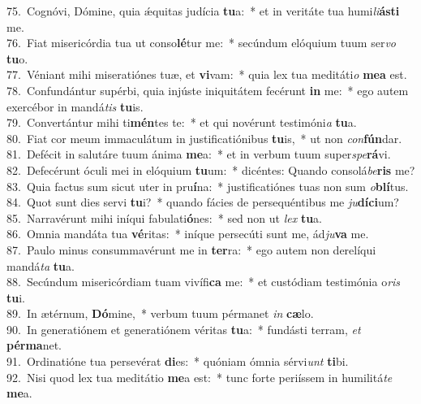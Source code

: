 {75.~}Cognóvi, Dómine, quia ǽquitas judícia \textbf{tu}a:~* et in veritáte tua humi\textit{li}\textbf{á}\textbf{sti} me.\\
{76.~}Fiat misericórdia tua ut conso\textbf{lé}tur me:~* secúndum elóquium tuum ser\textit{vo} \textbf{tu}o.\\
{77.~}Véniant mihi miseratiónes tuæ, et \textbf{vi}vam:~* quia lex tua meditáti\textit{o} \textbf{me}\textbf{a} est.\\
{78.~}Confundántur supérbi, quia injúste iniquitátem fecérunt \textbf{in} me:~* ego autem exercébor in mandá\textit{tis} \textbf{tu}is.\\
{79.~}Convertántur mihi ti\textbf{mén}tes te:~* et qui novérunt testimóni\textit{a} \textbf{tu}a.\\
{80.~}Fiat cor meum immaculátum in justificatiónibus \textbf{tu}is,~* ut non \textit{con}\textbf{fún}dar.\\
{81.~}Defécit in salutáre tuum ánima \textbf{me}a:~* et in verbum tuum super\textit{spe}\textbf{rá}vi.\\
{82.~}Defecérunt óculi mei in elóquium \textbf{tu}um:~* dicéntes: Quando consolá\textit{be}\textbf{ris} me?\\
{83.~}Quia factus sum sicut uter in pru\textbf{í}na:~* justificatiónes tuas non sum \textit{o}\textbf{blí}tus.\\
{84.~}Quot sunt dies servi \textbf{tu}i?~* quando fácies de persequéntibus me \textit{ju}\textbf{dí}\textbf{ci}um?\\
{85.~}Narravérunt mihi iníqui fabulati\textbf{ó}nes:~* sed non ut \textit{lex} \textbf{tu}a.\\
{86.~}Omnia mandáta tua \textbf{vé}ritas:~* iníque persecúti sunt me, ád\textit{ju}\textbf{va} me.\\
{87.~}Paulo minus consummavérunt me in \textbf{ter}ra:~* ego autem non derelíqui mandá\textit{ta} \textbf{tu}a.\\
{88.~}Secúndum misericórdiam tuam vivífi\textbf{ca} me:~* et custódiam testimónia o\textit{ris} \textbf{tu}i.\\
{89.~}In ætérnum, \textbf{Dó}mine,~* verbum tuum pérmanet \textit{in} \textbf{cæ}lo.\\
{90.~}In generatiónem et generatiónem véritas \textbf{tu}a:~* fundásti terram, \textit{et} \textbf{pér}\textbf{ma}net.\\
{91.~}Ordinatióne tua persevérat \textbf{di}es:~* quóniam ómnia sérvi\textit{unt} \textbf{ti}bi.\\
{92.~}Nisi quod lex tua meditátio \textbf{me}a est:~* tunc forte periíssem in humilitá\textit{te} \textbf{me}a.\\
